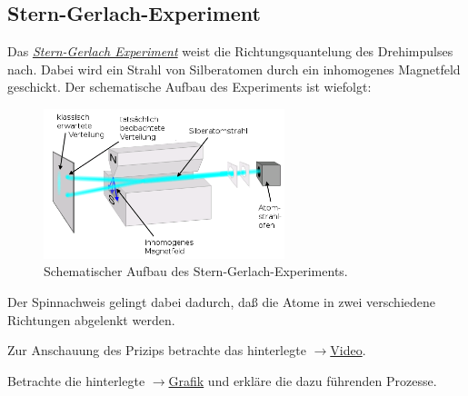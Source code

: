 \documentclass{subfiles}
\begin{document}
\subsection{Stern-Gerlach-Experiment}
    Das \href{https://de.wikipedia.org/wiki/Stern-Gerlach-Versuch}{\emph{Stern-Gerlach Experiment}} weist die Richtungsquantelung des Drehimpulses nach. Dabei wird ein Strahl von Silberatomen durch ein inhomogenes Magnetfeld geschickt. Der schematische Aufbau des Experiments ist wiefolgt:
    \begin{figure}[H]
        \centering
        \includegraphics[width=7cm]{Bilddateien/SternGerlach.png}
        \caption{Schematischer Aufbau des Stern-Gerlach-Experiments.}
    \end{figure}
    Der Spinnachweis gelingt dabei dadurch, daß die Atome in zwei verschiedene Richtungen abgelenkt werden. 
    \begin{Aufgabe}
        \nr{} Zur Anschauung des Prizips betrachte das hinterlegte $\to$\href{https://en.wikipedia.org/wiki/File:Quantum_spin_and_the_Stern-Gerlach_experiment.ogv}{Video}.

        \nr{} Betrachte die hinterlegte $\to$\href{https://upload.wikimedia.org/wikipedia/commons/c/cb/Stern-Gerlach_Analyzer_Sequential_Series_E3.png}{Grafik} und erkläre die dazu führenden Prozesse. 
    \end{Aufgabe}
\end{document}
